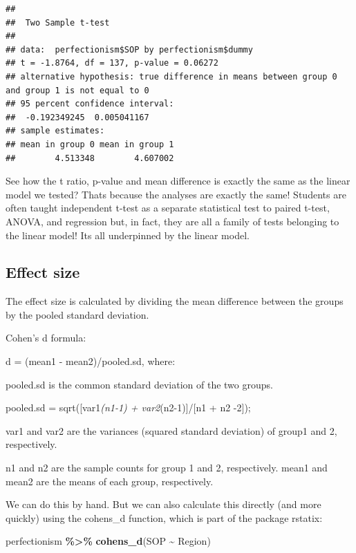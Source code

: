 \documentclass[
]{article}
\newenvironment{Shaded}{\begin{snugshade}}{\end{snugshade}}
\newcommand{\FunctionTok}[1]{\textcolor[rgb]{0.13,0.29,0.53}{\textbf{#1}}}
\newcommand{\NormalTok}[1]{#1}
\newcommand{\SpecialCharTok}[1]{\textcolor[rgb]{0.81,0.36,0.00}{\textbf{#1}}}
\begin{document}
\begin{verbatim}
## 
##  Two Sample t-test
## 
## data:  perfectionism$SOP by perfectionism$dummy
## t = -1.8764, df = 137, p-value = 0.06272
## alternative hypothesis: true difference in means between group 0 and group 1 is not equal to 0
## 95 percent confidence interval:
##  -0.192349245  0.005041167
## sample estimates:
## mean in group 0 mean in group 1 
##        4.513348        4.607002
\end{verbatim}

See how the t ratio, p-value and mean difference is exactly the same as
the linear model we tested? Thats because the analyses are exactly the
same! Students are often taught independent t-test as a separate
statistical test to paired t-test, ANOVA, and regression but, in fact,
they are all a family of tests belonging to the linear model! Its all
underpinned by the linear model.

\subsection{Effect size}\label{effect-size}

The effect size is calculated by dividing the mean difference between
the groups by the pooled standard deviation.

Cohen's d formula:

d = (mean1 - mean2)/pooled.sd, where:

pooled.sd is the common standard deviation of the two groups.

pooled.sd = sqrt({[}var1\emph{(n1-1) + var2}(n2-1){]}/{[}n1 + n2 -2{]});

var1 and var2 are the variances (squared standard deviation) of group1
and 2, respectively.

n1 and n2 are the sample counts for group 1 and 2, respectively. mean1
and mean2 are the means of each group, respectively.

We can do this by hand. But we can also calculate this directly (and
more quickly) using the cohens\_d function, which is part of the package
rstatix:

\begin{Shaded}
\begin{Highlighting}[]
\NormalTok{perfectionism }\SpecialCharTok{\%\textgreater{}\%}
\FunctionTok{cohens\_d}\NormalTok{(SOP }\SpecialCharTok{\textasciitilde{}}\NormalTok{ Region)}
\end{Highlighting}
\end{Shaded}
\end{document}
